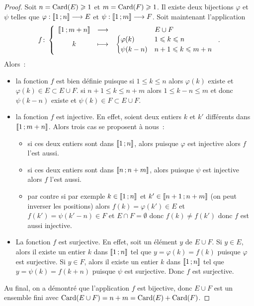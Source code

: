 \begin{proof}
  Soit \(n = \operatorname{Card}(E)\geqslant 1\) et \(m = \operatorname{Card}(F)\geqslant 1\). Il existe 
  deux bijections \(\varphi\) et \(\psi\) telles que 
  \(\varphi:\mathopen{\llbracket}1\mathclose{}\mathpunct{};n\mathclose{\rrbracket} \longrightarrow E\) et 
  \(\psi:\mathopen{\llbracket}1\mathclose{}\mathpunct{};m\mathclose{\rrbracket} \longrightarrow F\). Soit maintenant 
  l'application
  \begin{equation}
    f\colon \left\{\begin{array}{ccc} \mathopen{\llbracket}1\mathclose{}\mathpunct{};m + n\mathclose{\rrbracket} & \longrightarrow &E\cup F\\ k & \longmapsto & \begin{cases} 
        \varphi(k) & 1\leqslant k\leqslant n \\ \psi(k - n) & n + 1\leqslant 
    k\leqslant m + n\end{cases} \end{array} \right..
  \end{equation}
  Alors~:
  \begin{itemize}
    \item la fonction \(f\) est bien définie puisque si \(1\leqslant k \leqslant 
      n\) alors \(\varphi(k)\) existe et \(\varphi(k)\in E\subset E\cup F\). si 
      \(n + 1\leqslant k \leqslant n + m\) alors \(1\leqslant k - n \leqslant 
      m\) et donc \(\psi(k - n)\) existe et \(\psi(k)\in F\subset E\cup F\).
    \item la fonction \(f\) est injective. En effet, soient deux entiers \(k\) 
      et \(k'\) différents  dans \(\mathopen{\llbracket}1\mathclose{}\mathpunct{};m + n\mathclose{\rrbracket}\). Alors trois 
      cas se proposent à nous~:
      \begin{itemize}
        \item si ces deux entiers sont dans \(\mathopen{\llbracket}1\mathclose{}\mathpunct{};n\mathclose{\rrbracket}\), alors 
          puisque \(\varphi\) est injective alors \(f\) l'est aussi.
        \item si ces deux entiers sont dans \(\mathopen{\llbracket}n\mathclose{}\mathpunct{};n + m\mathclose{\rrbracket}\), 
          alors puisque \(\psi\) est injective alors \(f\) l'est aussi.
        \item par contre si par exemple \(k\in\mathopen{\llbracket}1\mathclose{}\mathpunct{};n\mathclose{\rrbracket}\) et 
          \(k'\in\mathopen{\llbracket}n + 1\mathclose{}\mathpunct{};n + m\mathclose{\rrbracket}\) (on peut inverser les 
          positions) alors \(f(k) = \varphi(k')\in E\) et \(f(k') = 
          \psi(k'-n)\in F\) et \(E\cap F = \emptyset\) donc \(f(k)\neq f(k')\) 
          donc \(f\) est aussi injective.
      \end{itemize}
    \item La fonction \(f\) est surjective. En effet, soit un élément \(y\) de 
      \(E\cup F\). Si \(y\in E\), alors il existe un entier \(k\) dans 
      \(\mathopen{\llbracket}1\mathclose{}\mathpunct{};n\mathclose{\rrbracket}\) tel que \(y = \varphi(k) = f(k)\) puisque 
      \(\varphi\) est surjective. Si \(y\in F\), alors il existe un entier \(k\) 
      dans \(\mathopen{\llbracket}1\mathclose{}\mathpunct{};n\mathclose{\rrbracket}\) tel que \(y = \psi(k) = f(k + n)\) 
      puisque \(\psi\) est surjective. Donc \(f\) est surjective.
  \end{itemize}
  Au final, on a démontré que l'application \(f\) est bijective, donc \(E\cup 
  F\) est un ensemble fini avec \(\operatorname{Card}(E\cup F) = n + m = \operatorname{Card}(E)+\operatorname{Card}(F)\).
\end{proof}

